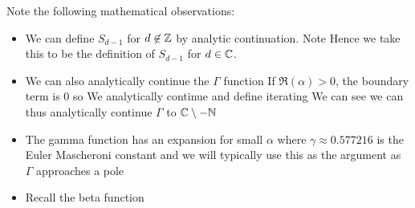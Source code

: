 \documentclass{article}
\begin{document}
Note the following mathematical observations: 
\begin{itemize}
    \item We can define $S_{d-1}$ for $d \not\in\mathbb{Z}$ by analytic continuation. Note 
    Hence 
    we take this to be the definition of $S_{d-1}$ for $d\in\mathbb{C}$. 
    \item We can also analytically continue the $\Gamma$ function 
    If $\Re(\alpha) > 0$, the boundary term is 0 so 
    We analytically continue and define 
iterating 
We can see we can thus analytically continue $\Gamma$ to $\mathbb{C}\setminus -\mathbb{N}$

\item The gamma function has an expansion for small $\alpha$ 
where $\gamma \approx 0.577216$ is the Euler Mascheroni constant and
we will typically use this as the argument as $\Gamma$ approaches a pole 
\item Recall the beta function 
\end{itemize}
\end{document}
